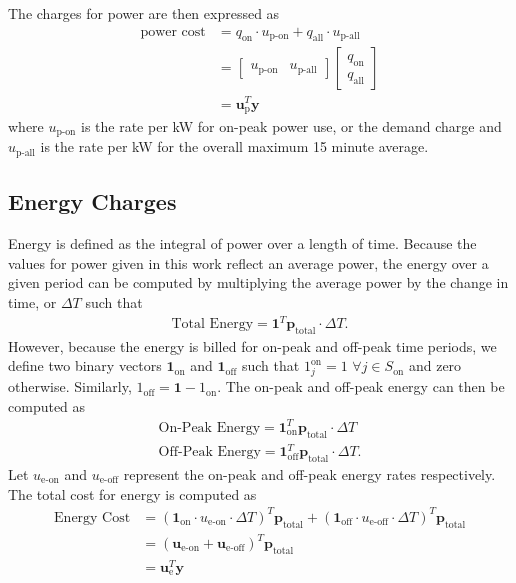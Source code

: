 The charges for power are then expressed as 
\begin{equation} \begin{aligned}
	\text{power cost} &= q_{\text{on}}\cdot u_{\text{p-on}} + q_{\text{all}} \cdot u_{\text{p-all}} \\
			  &= \begin{bmatrix}u_{\text{p-on}} & u_{\text{p-all}} \end{bmatrix}\begin{bmatrix}q_{\text{on}} \\ q_{\text{all}} \end{bmatrix} \\
		          &= \mathbf{u}_{\text{p}}^T\mathbf{y}
\end{aligned}\end{equation}
where $u_{\text{p-on}}$ is the rate per kW for on-peak power use, or the demand charge and $u_{\text{p-all}}$ is the rate per kW for the overall maximum 15 minute average.
\subsection{Energy Charges}
Energy is defined as the integral of power over a length of time.  Because the values for power given in this work reflect an average power, the energy over a given period can be computed by multiplying the average power by the change in time, or $\Delta T$ such that
\begin{equation}\begin{aligned}
	\text{Total Energy} = \mathbf{1}^T\mathbf{p}_{\text{total}}\cdot \Delta T.
\end{aligned}\end{equation}
However, because the energy is billed for on-peak and off-peak time periods, we define two binary vectors $\mathbf{1}_{\text{on}}$ and $\mathbf{1}_{\text{off}}$ such that $1^{\text{on}}_j = 1$ $\forall j \in S_{\text{on}}$ and zero otherwise. Similarly,  $1_{\text{off}} = \mathbf{1} - 1_{\text{on}}$. The on-peak and off-peak energy can then be computed as
\begin{equation}\begin{aligned}
	\text{On-Peak Energy} = \mathbf{1}_{\text{on}}^T\mathbf{p}_{\text{total}}\cdot\Delta T\\
	\text{Off-Peak Energy} = \mathbf{1}_{\text{off}}^T\mathbf{p}_{\text{total}}\cdot\Delta T.
\end{aligned}\end{equation}
Let $u_{\text{e-on}}$ and $u_{\text{e-off}}$ represent the on-peak and off-peak energy rates respectively. The total cost for energy is computed as
\begin{equation} \begin{aligned}
	\text{Energy Cost} &= \left(\mathbf{1}_{\text{on}}\cdot u_{\text{e-on}}\cdot\Delta T \right )^T\mathbf{p}_{\text{total}} + \left(\mathbf{1}_{\text{off}}\cdot u_{\text{e-off}}\cdot\Delta T \right )^T\mathbf{p}_{\text{total}} \\
			   &= \left(\mathbf{u}_{\text{e-on}} + \mathbf{u}_{\text{e-off}}\right )^T\mathbf{p}_{\text{total}}\\
			   &= \mathbf{u}_{\text{e}}^T\mathbf{y}
\end{aligned} \end{equation}
